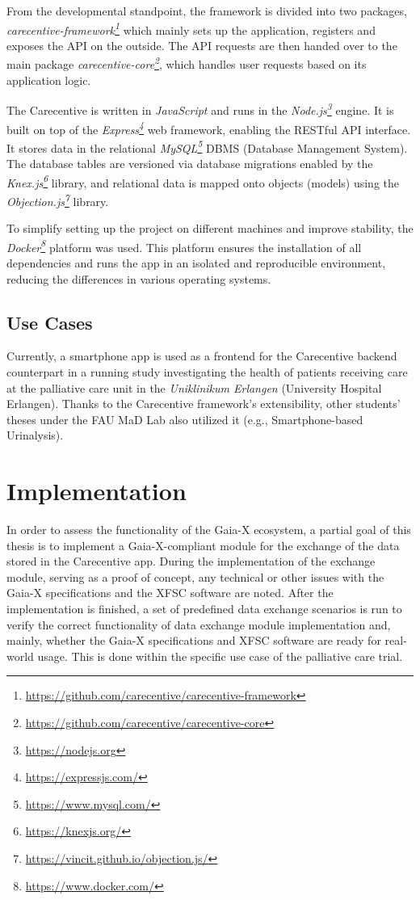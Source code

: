 From the developmental standpoint, the framework is divided into two packages, \textit{carecentive-framework\footnote{\url{https://github.com/carecentive/carecentive-framework}}} which mainly sets up the application, registers and exposes the API on the outside.
The API requests are then handed over to the main package \textit{carecentive-core\footnote{\url{https://github.com/carecentive/carecentive-core}}}, which handles user requests based on its application logic.

The Carecentive is written in \textit{JavaScript} and runs in the \textit{Node.js\footnote{\url{https://nodejs.org}}} engine.
It is built on top of the \textit{Express\footnote{\url{https://expressjs.com/}}} web framework, enabling the RESTful API interface.
It stores data in the relational \textit{MySQL\footnote{\url{https://www.mysql.com/}}} DBMS (Database Management System).
The database tables are versioned via database migrations enabled by the \textit{Knex.js\footnote{\url{https://knexjs.org/}}} library, and relational data is mapped onto objects (models) using the \textit{Objection.js\footnote{\url{https://vincit.github.io/objection.js/}}} library.

To simplify setting up the project on different machines and improve stability, the \textit{Docker\footnote{\url{https://www.docker.com/}}} platform was used.
This platform ensures the installation of all dependencies and runs the app in an isolated and reproducible environment, reducing the differences in various operating systems.

\subsection{Use Cases}\label{subsec:use-cases}

Currently, a smartphone app is used as a frontend for the Carecentive backend counterpart in a running study investigating the health of patients receiving care at the palliative care unit in the \textit{Uniklinikum Erlangen} (University Hospital Erlangen).
Thanks to the Carecentive framework's extensibility, other students' theses under the FAU MaD Lab also utilized it (e.g., Smartphone-based Urinalysis).

\section{Implementation}\label{sec:implementation}

In order to assess the functionality of the Gaia-X ecosystem, a partial goal of this thesis is to implement a Gaia-X-compliant module for the exchange of the data stored in the Carecentive app.
During the implementation of the exchange module, serving as a proof of concept, any technical or other issues with the Gaia-X specifications and the XFSC software are noted.
After the implementation is finished, a set of predefined data exchange scenarios is run to verify the correct functionality of data exchange module implementation and, mainly, whether the Gaia-X specifications and XFSC software are ready for real-world usage.
This is done within the specific use case of the palliative care trial.

